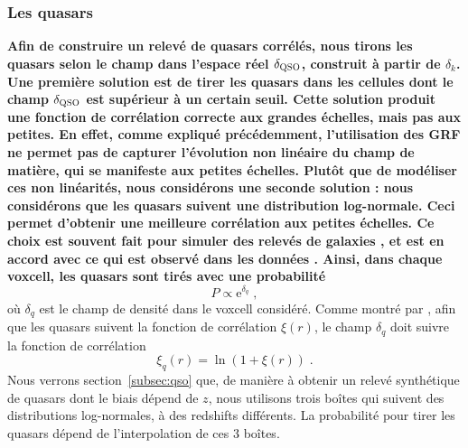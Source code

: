 \documentclass[11pt, twoside, a4paper, openright]{report}
\begin{document}
\subsubsection{Les quasars}
\label{subsubsec:boiteqso}
\textbf{Afin de construire un relevé de quasars corrélés, nous tirons les quasars selon le champ dans l'espace réel $\delta_{\textsc{QSO}}$, construit à partir de $\delta_k$. Une première solution est de tirer les quasars dans les cellules dont le champ $\delta_{\textsc{QSO}}$ est supérieur à un certain seuil. Cette solution produit une fonction de corrélation correcte aux grandes échelles, mais pas aux petites.
En effet, comme expliqué précédemment, l'utilisation des GRF ne permet pas de capturer l'évolution non linéaire du champ de matière, qui se manifeste aux petites échelles.
Plutôt que de modéliser ces non linéarités, nous considérons une seconde solution : nous considérons que les quasars suivent une distribution log-normale. Ceci permet d'obtenir une meilleure corrélation aux petites échelles.
Ce choix est souvent fait pour simuler des relevés de galaxies \citep{agrawal_generating_2017}, et est en accord avec ce qui est observé dans les données \citep{Clerkin2016}.
Ainsi, dans chaque voxcell, les quasars sont tirés avec une probabilité}
\begin{equation}
  P \propto \mathrm{e}^{\delta_q} \; ,
\end{equation}
où $\delta_q$ est le champ de densité dans le voxcell considéré.
Comme montré par \citet{coles_lognormal_1991}, afin que les quasars suivent la fonction de corrélation $\xi(r)$, le champ $\delta_q$ doit suivre la fonction de corrélation 
\begin{equation}
  \label{eq:lognormal}
  \xi_q(r) = \ln(1+\xi(r)) \; .
\end{equation}
Nous verrons section~\ref{subsec:qso} que, de manière à obtenir un relevé synthétique de quasars dont le biais dépend de $z$, nous utilisons trois boîtes qui suivent des distributions log-normales, à des redshifts différents. La probabilité pour tirer les quasars dépend de l'interpolation de ces 3 boîtes.
\end{document}
